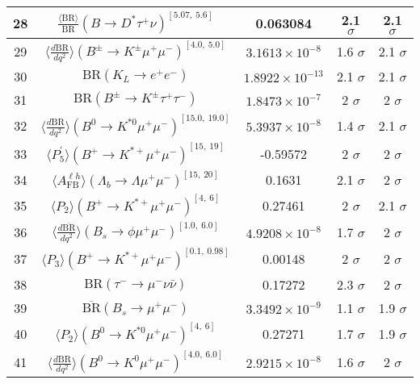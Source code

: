 \begin{longtable}{|c|c|c|c|c|}
28 &	 $\frac{\langle \mathrm{BR} \rangle}{\mathrm{BR}}(B\to D^\ast\tau^+\nu)^{[5.07,\  5.6]}$ &	 0.063084 &	 \cellcolor{green!0} 2.1 $ \sigma$ &	 2.1 $ \sigma$ \\ \hline
29 &	 $\langle \frac{d\mathrm{BR}}{dq^2} \rangle(B^\pm\to K^\pm \mu^+\mu^-)^{[4.0,\  5.0]}$ &	 $3.1613\times 10^{-8}$ &	 \cellcolor{green!25} 1.6 $ \sigma$ &	 2.1 $ \sigma$ \\ \hline
30 &	 $\mathrm{BR}(K_L\to e^+e^-)$ &	 $1.8922\times 10^{-13}$ &	 \cellcolor{red!0} 2.1 $ \sigma$ &	 2.1 $ \sigma$ \\ \hline
31 &	 $\mathrm{BR}(B^\pm\to K^\pm \tau^+\tau^-)$ &	 $1.8473\times 10^{-7}$ &	 \cellcolor{green!0} 2 $ \sigma$ &	 2 $ \sigma$ \\ \hline
32 &	 $\langle \frac{d\mathrm{BR}}{dq^2} \rangle(B^0\to K^{\ast 0}\mu^+\mu^-)^{[15.0,\  19.0]}$ &	 $5.3937\times 10^{-8}$ &	 \cellcolor{green!35} 1.4 $ \sigma$ &	 2.1 $ \sigma$ \\ \hline
33 &	 $\langle P_5^\prime\rangle(B^+\to K^{\ast +}\mu^+\mu^-)^{[15,\  19]}$ &	 -0.59572 &	 \cellcolor{green!0} 2 $ \sigma$ &	 2 $ \sigma$ \\ \hline
34 &	 $\langle A_\mathrm{FB}^{\ell h}\rangle(\Lambda_b\to\Lambda \mu^+\mu^-)^{[15,\  20]}$ &	 0.1631 &	 \cellcolor{red!0} 2.1 $ \sigma$ &	 2 $ \sigma$ \\ \hline
35 &	 $\langle P_2\rangle(B^+\to K^{\ast +}\mu^+\mu^-)^{[4,\  6]}$ &	 0.27461 &	 \cellcolor{green!4} 2 $ \sigma$ &	 2.1 $ \sigma$ \\ \hline
36 &	 $\langle \frac{d\overline{\mathrm{BR}}}{dq^2} \rangle(B_s\to \phi \mu^+\mu^-)^{[1.0,\  6.0]}$ &	 $4.9208\times 10^{-8}$ &	 \cellcolor{green!14} 1.7 $ \sigma$ &	 2 $ \sigma$ \\ \hline
37 &	 $\langle P_3\rangle(B^+\to K^{\ast +}\mu^+\mu^-)^{[0.1,\  0.98]}$ &	 0.00148 &	 \cellcolor{green!0} 2 $ \sigma$ &	 2 $ \sigma$ \\ \hline
38 &	 $\mathrm{BR}(\tau^-\to \mu^- \nu\bar\nu)$ &	 0.17272 &	 \cellcolor{red!16} 2.3 $ \sigma$ &	 2 $ \sigma$ \\ \hline
39 &	 $\overline{\mathrm{BR}}(B_s\to \mu^+\mu^-)$ &	 $3.3492\times 10^{-9}$ &	 \cellcolor{green!41} 1.1 $ \sigma$ &	 1.9 $ \sigma$ \\ \hline
40 &	 $\langle P_2\rangle(B^0\to K^{\ast 0}\mu^+\mu^-)^{[4,\  6]}$ &	 0.27271 &	 \cellcolor{green!9} 1.7 $ \sigma$ &	 1.9 $ \sigma$ \\ \hline
41 &	 $\langle \frac{d\mathrm{BR}}{dq^2} \rangle(B^0\to K^0\mu^+\mu^-)^{[4.0,\  6.0]}$ &	 $2.9215\times 10^{-8}$ &	 \cellcolor{green!19} 1.6 $ \sigma$ &	 2 $ \sigma$ \\ \hline

\end{longtable}
